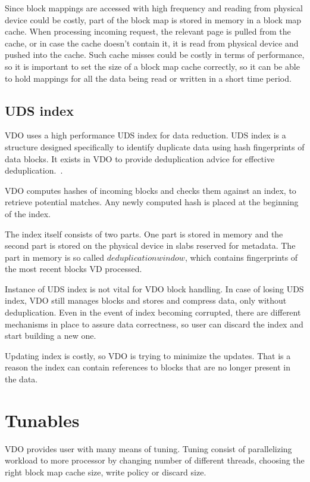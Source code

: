 \documentclass[
  color, %
  table, %
  lof,   %
  lot,   %
]{fithesis3}
\begin{document}
Since block mappings are accessed with high frequency and reading from physical device could be costly, part of the block map is stored in memory in a block map cache. When processing incoming request, the relevant page is pulled from the cache, or in case the cache doesn't contain it, it is read from physical device and pushed into the cache. Such cache misses could be costly in terms of performance, so it is important to set the size of a block map cache correctly, so it can be able to hold mappings for all the data being read or written in a short time period.



\subsection{UDS index}
VDO uses a high performance UDS index for data reduction. UDS index is a structure designed specifically to identify duplicate data using hash fingerprints of data blocks. It exists in VDO to provide deduplication advice for effective deduplication.~\cite{man:udsindex}.

VDO computes hashes of incoming blocks and checks them against an index, to retrieve potential matches. Any newly computed hash is placed at the beginning of the index.

The index itself consists of two parts. One part is stored in memory and the second part is stored on the physical device in slabs reserved for metadata. The part in memory is so called $deduplication window$, which contains fingerprints of the most recent blocks VD processed. 

Instance of UDS index is not vital for VDO block handling. In case of losing UDS index, VDO still manages blocks and stores and compress data, only without deduplication. Even in the event of index becoming corrupted, there are different mechanisms in place to assure data correctness, so user can discard the index and start building a new one.

Updating index is costly, so VDO is trying to minimize the updates. That is a reason the index can contain references to blocks that are no longer present in the data.


\section{Tunables}
VDO provides user with many means of tuning. Tuning consist of parallelizing workload to more processor by changing number of different threads, choosing the right block map cache size, write policy or discard size.
\end{document}
